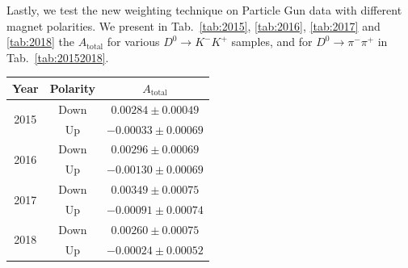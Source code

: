 \documentclass{article}
\begin{document}
        Lastly, we test the new weighting technique on Particle Gun data with different magnet polarities.
        We present in Tab.~\ref{tab:2015}, \ref{tab:2016}, \ref{tab:2017} and \ref{tab:2018} the $A_\text{total}$ for various $D^0\to K^-K^+$ samples, and for $D^0\to \pi^-\pi^+$ in Tab.~\ref{tab:20152018}.
        \begin{center}
                \begin{tabular}{c|c|c}
                        Year & Polarity & $A_\text{total}$\\
                        \hline\hline
                        \multirow{2}{*}{2015} & Down & $0.00284 \pm 0.00049$\\
                        \cline{2-3}
                        & Up & $-0.00033\pm 0.00069$\\
                        \hline
                        \multirow{2}{*}{2016} & Down & $0.00296\pm 0.00069$\\
                        \cline{2-3}
                        & Up & $-0.00130\pm 0.00069$\\
                        \hline
                        \multirow{2}{*}{2017} & Down & $0.00349\pm 0.00075$\\
                        \cline{2-3}
                        & Up & $-0.00091\pm 0.00074$\\
                        \hline
                        \multirow{2}{*}{2018} & Down & $0.00260\pm 0.00075$\\
                        \cline{2-3}
                        & Up & $-0.00024\pm 0.00052$\\
                \end{tabular}
                \label{tab:20152018}
        \end{center}
\end{document}
